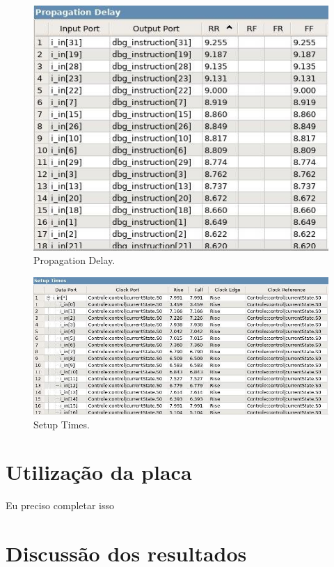 \documentclass{article}
\begin{document}
        \begin{figure}[H]
            \centering
            \includegraphics[width=\textwidth]{propagation_delay.jpg}
            \caption{Propagation Delay.}
            \label{figura:mips}
        \end{figure}

        \begin{figure}[H]
            \centering
            \includegraphics[width=\textwidth]{setup_times.jpg}
            \caption{Setup Times.}
            \label{figura:mips}
        \end{figure}


    \section{Utilização da placa}

    Eu preciso completar isso

    \section{Discussão dos resultados}
\end{document}
